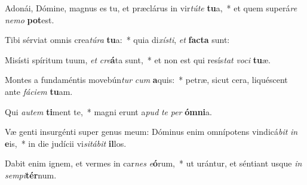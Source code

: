\item Adonái, Dómine, magnus es tu, et præclárus in vir\textit{tú}\textit{te} \textbf{tu}a,~* et quem superá\textit{re} \textit{ne}\textit{mo} \textbf{pot}est.
\item Tibi sérviat omnis crea\textit{tú}\textit{ra} \textbf{tu}a:~* quia di\textit{xís}\textit{ti}, \textit{et} \textbf{fac}\textbf{ta} sunt:
\item Misísti spíritum tuum, \textit{et} \textit{cre}\textbf{á}ta sunt,~* et non est qui resís\textit{tat} \textit{vo}\textit{ci} \textbf{tu}æ.
\item Montes a fundaméntis movebún\textit{tur} \textit{cum} \textbf{a}quis:~* petræ, sicut cera, liquéscent ante \textit{fá}\textit{ci}\textit{em} \textbf{tu}am.
\item Qui \textit{au}\textit{tem} \textbf{ti}ment te,~* magni erunt a\textit{pud} \textit{te} \textit{per} \textbf{óm}\textbf{ni}a.
\item Væ genti insurgénti super genus meum: Dóminus enim omnípotens vindicá\textit{bit} \textit{in} \textbf{e}is,~* in die judícii vi\textit{si}\textit{tá}\textit{bit} \textbf{il}los.
\item Dabit enim ignem, et vermes in car\textit{nes} \textit{e}\textbf{ó}rum,~* ut urántur, et séntiant usque \textit{in} \textit{sem}\textit{pi}\textbf{tér}num.
